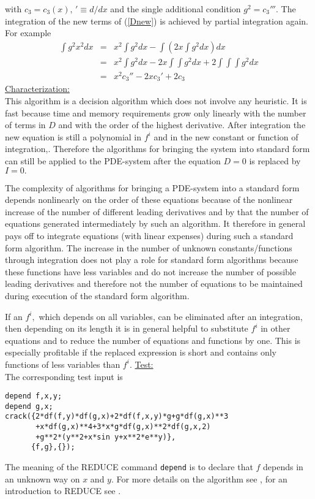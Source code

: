 with $c_3 = c_3(x), \, '\equiv d/dx$ and the single additional 
condition $g^2 = c_3'''.$
The integration of the new terms of (\ref{Dnew}) is
achieved by partial integration again. For example
\begin{eqnarray*}
\int g^2x^2 dx & = & x^2\int g^2 dx - \int (2x\!\int g^2 dx) dx \\
& = & x^2\int g^2 dx - 2x\int\!\!\int g^2 dx 
+ 2 \int\!\!\int\!\!\int g^2 dx \\
& = & x^2c_3'' - 2xc_3' + 2c_3
\end{eqnarray*}
\underline{Characterization:} \\
This algorithm is a decision algorithm which does not involve any
heuristic. It is fast because time and memory requirements grow only
linearly with the number of terms in $D$ and with the order of
the highest derivative.
After integration the new equation is still a polynomial
in $f^i$ and in the new constant or function of integration,.
Therefore the algorithms for bringing the system into standard form can still 
be applied to the PDE-system 
after the equation $D = 0$ is replaced by $I = 0.$

The complexity of algorithms for bringing a PDE-system into a standard
form depends nonlinearly on the order of these equations because of
the nonlinear increase of the number of different leading derivatives
and by that the number of equations generated intermediately by such
an algorithm. It therefore in general pays off to integrate equations (with
linear expenses) during such a standard form algorithm.  The increase
in the number of unknown constants/functions through integration does
not play a role for standard form algorithms because these functions
have less variables and do not increase the number of possible leading
derivatives and therefore not the number of equations to be maintained
during execution of the standard form algorithm.

If an $f^i,$ which depends on all variables, can be eliminated after an 
integration, then depending on its length 
it is in general helpful to substitute $f^i$ in other equations and
to reduce the number of equations and functions by one. This is especially
profitable if the replaced expression is short and 
contains only functions of less variables than $f^i.$
\underline{Test:} \\
The corresponding test input is
\begin{verbatim}
depend f,x,y;
depend g,x;
crack({2*df(f,y)*df(g,x)+2*df(f,x,y)*g+g*df(g,x)**3
       +x*df(g,x)**4+3*x*g*df(g,x)**2*df(g,x,2)
       +g**2*(y**2+x*sin y+x**2*e**y)},
      {f,g},{});
\end{verbatim}
The meaning of the REDUCE command {\tt depend} is to declare that $f$
depends in an unknown way on $x$ and $y$. For more details on the
algorithm see \cite{WoInt}, for an introduction to REDUCE see \cite{WM}.

